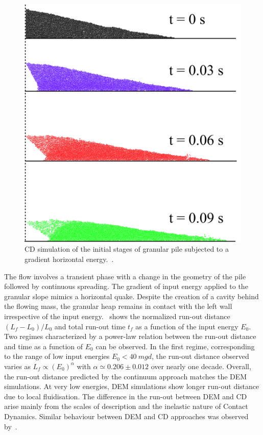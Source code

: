\begin{figure}
\centering
\includegraphics[width=\textwidth]{Gradient_Slope_CD_200J}
\caption{CD simulation of the initial stages of granular pile subjected to a 
gradient horizontal energy.~\citep{Mutabaruka2013}.}
\label{fig:Gradient_Slope_CD_200J}
\end{figure}

The flow involves a transient phase with a change in the geometry of the pile 
followed by continuous spreading. The gradient of input energy applied to the 
granular slope mimics a horizontal quake. Despite the creation 
of a cavity behind the flowing mass, the granular heap remains in 
contact with the left wall irrespective of the input 
energy.~ shows the normalized run-out distance 
$(L_f - L_0)/L_0$ and total run-out time $t_f$ as a function of the input 
energy $E_0$. Two regimes characterized by a power-law relation between 
the run-out distance and time as a function of $E_0$ can be observed. In the 
first regime, corresponding to the range of low input energies $E_0 < 40 \ 
mgd$, the run-out distance observed varies as $L_f \propto (E_0)^\alpha$ with 
$\alpha 
\simeq 0.206 \pm 0.012$ over nearly one decade. Overall, the run-out distance 
predicted by the continuum approach matches the DEM simulations. At very low 
energies, DEM simulations show longer run-out distance due to local 
fluidisation. The difference in the run-out between DEM and CD arise mainly 
from the scales of description and the inelastic nature of Contact Dynamics. 
Similar behaviour between DEM and CD approaches was observed 
by~\citet{Radjai1997}. 


